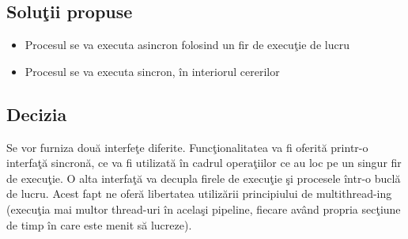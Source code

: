	\subsection{Soluţii propuse}
	\begin{itemize}
	 \setlength\itemsep{0em}
		\item Procesul se va executa asincron folosind un fir de execuţie de lucru
		\item	Procesul se va executa sincron, în interiorul cererilor
	\end{itemize}


	\subsection{Decizia}
	Se vor furniza două interfeţe diferite. Funcţionalitatea va fi oferită printr-o interfaţă sincronă, ce va fi utilizată în cadrul operaţiilor ce au loc pe un singur fir de execuţie. O alta interfaţă va decupla firele de execuţie şi procesele într-o buclă de lucru.
	Acest fapt ne oferă libertatea utilizării principiului de multithread-ing (execuţia mai multor thread-uri în acelaşi pipeline, fiecare având propria secţiune de timp în care este menit să lucreze).


